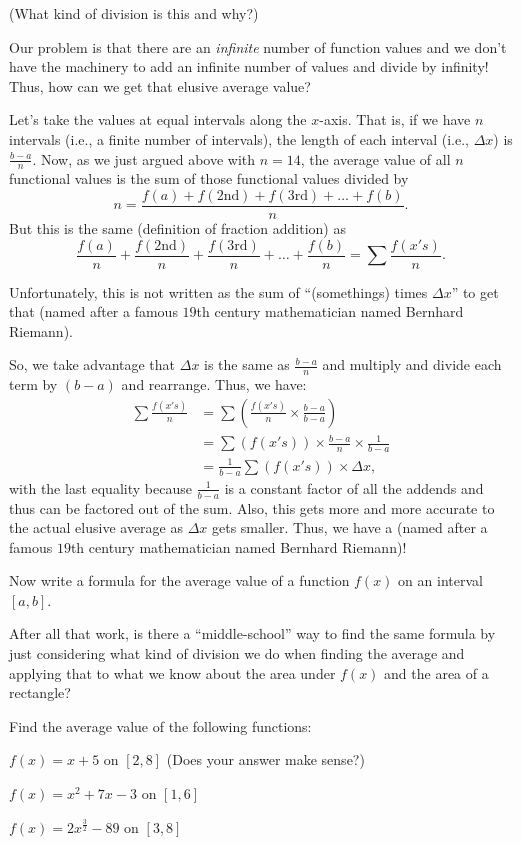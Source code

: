 \documentclass{ximera}
\begin{document}
(What kind of division is this and why?)

Our problem is that there are an {\em infinite} number of function values and we don't have the machinery to add an infinite number of values and divide by infinity!  Thus, how can we get that elusive average value?

Let's take the values at equal intervals along the $x$-axis.  That is, if we have $n$ intervals (i.e., a finite number of intervals), the length of each interval (i.e.,  $\Delta x$) is  $\frac{b-a}{n}$.  Now, as we just argued above with $n = 14$,  the average value of all $n$ functional values is the sum of those functional values divided by 
\[
n =  \frac{f(a) + f(2\text{nd}) + f(3\text{rd}) + \dots + f(b)}{n}.
\]
But this is the same (definition of fraction addition) as  
\[
\frac{f(a)}{n} + \frac{f(2\text{nd})}{n} + \frac{f(3\text{rd})}{n} + \dots + \frac{f(b)}{n} = \sum \frac{f(x's)}{n}.
\]

Unfortunately, this is not written as the sum of ``(somethings) times  $\Delta x$'' to get that \underline{\hspace{0.5in}} (named after a famous $19$th century mathematician named Bernhard Riemann).  

So, we take advantage that $\Delta x$ is the same as $\frac{b-a}{n}$  and multiply and divide each term by $(b-a)$ and rearrange.  Thus, we have:
\begin{align*}
\sum \frac{f(x's)}{n} &= \sum\left ( \frac{f(x's)}{n}\times \frac{b-a}{b-a}\right)\\ 
&= \sum (f(x's)) \times \frac{b-a}{n}\times \frac{1}{b-a} \\
&= \frac{1}{b-a}\sum (f(x's))\times \Delta x,
\end{align*}
with the last equality because $\frac{1}{b-a}$ is a constant factor of all the addends and thus can be factored out of the sum.  Also, this gets more and more accurate to the actual elusive average as $\Delta x$ gets smaller.  Thus, we have a \underline{\hspace{0.5in}} (named after a famous $19$th century mathematician named Bernhard Riemann)!

Now write a formula for the average value of a function $f(x)$ on an interval $[a, b]$.

After all that work, is there a ``middle-school'' way to find the same formula by just considering what kind of division we do when finding the average and applying that to what we know about the area under $f(x)$ and the area of a rectangle?

Find the average value of the following functions:

\begin{problem} 
$f(x) = x+5$ on $[2, 8]$ (Does your answer make sense?)
\end{problem}
\begin{problem} 
$f(x) = x^2+7x-3$ on $[1, 6]$
\end{problem}
\begin{problem} 
$f(x) = 2x^{\frac{3}{2}}-89$ on $[3, 8]$
\end{problem}
\end{document}
